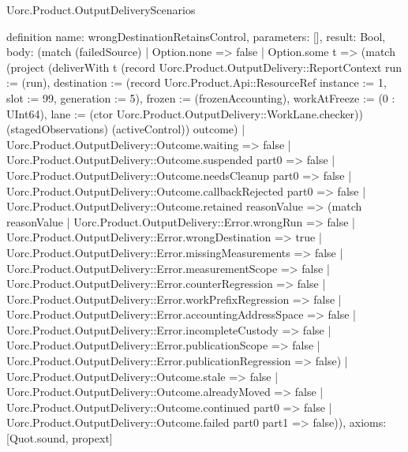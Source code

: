 \begin{lexlean}{Uorc.Product.OutputDeliveryScenarios}
\begin{semanticmodule}
definition{
  name: wrongDestinationRetainsControl,
  parameters: [],
  result: Bool,
  body: (match (failedSource)
    | Option.none => false
    | Option.some t => (match (project (deliverWith t (record Uorc.Product.OutputDelivery::ReportContext {run := (run), destination := (record Uorc.Product.Api::ResourceRef {instance := 1, slot := 99, generation := 5}), frozen := (frozenAccounting), workAtFreeze := (0 : UInt64), lane := (ctor Uorc.Product.OutputDelivery::WorkLane.checker)}) (stagedObservations) (activeControl)) outcome)
      | Uorc.Product.OutputDelivery::Outcome.waiting => false
      | Uorc.Product.OutputDelivery::Outcome.suspended part0 => false
      | Uorc.Product.OutputDelivery::Outcome.needsCleanup part0 => false
      | Uorc.Product.OutputDelivery::Outcome.callbackRejected part0 => false
      | Uorc.Product.OutputDelivery::Outcome.retained reasonValue => (match reasonValue
        | Uorc.Product.OutputDelivery::Error.wrongRun => false
        | Uorc.Product.OutputDelivery::Error.wrongDestination => true
        | Uorc.Product.OutputDelivery::Error.missingMeasurements => false
        | Uorc.Product.OutputDelivery::Error.measurementScope => false
        | Uorc.Product.OutputDelivery::Error.counterRegression => false
        | Uorc.Product.OutputDelivery::Error.workPrefixRegression => false
        | Uorc.Product.OutputDelivery::Error.accountingAddressSpace => false
        | Uorc.Product.OutputDelivery::Error.incompleteCustody => false
        | Uorc.Product.OutputDelivery::Error.publicationScope => false
        | Uorc.Product.OutputDelivery::Error.publicationRegression => false)
      | Uorc.Product.OutputDelivery::Outcome.stale => false
      | Uorc.Product.OutputDelivery::Outcome.alreadyMoved => false
      | Uorc.Product.OutputDelivery::Outcome.continued part0 => false
      | Uorc.Product.OutputDelivery::Outcome.failed part0 part1 => false)),
  axioms: [Quot.sound, propext]
}


\end{semanticmodule}
\end{lexlean}
